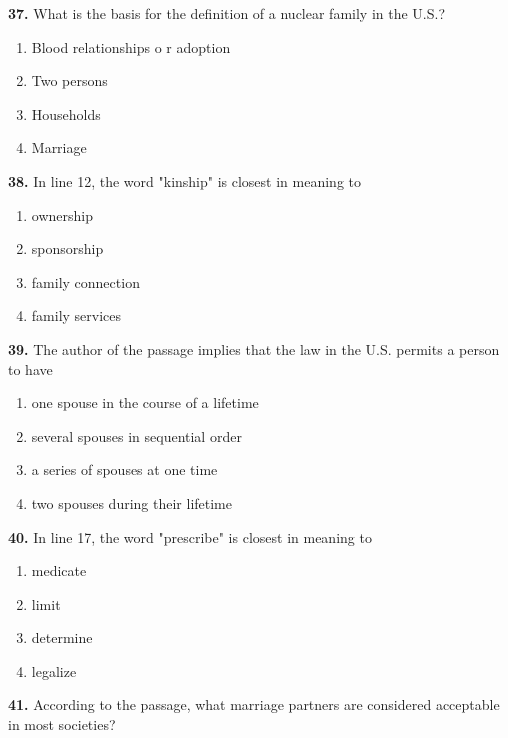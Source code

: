 \documentclass[12pt]{article}
\begin{document}
\par
\vspace{0.25\baselineskip}
\noindent\textbf{37.} What is the basis for the definition of a nuclear family in the U.S.?
\begin{enumerate}[label=(\Alph*),leftmargin=*,itemsep=0.2em]
\item Blood relationships o r adoption
\item Two persons
\item Households
\item Marriage
\end{enumerate}
\par
\vspace{0.25\baselineskip}
\noindent\textbf{38.} In line 12, the word "kinship" is closest in meaning to
\begin{enumerate}[label=(\Alph*),leftmargin=*,itemsep=0.2em]
\item ownership
\item sponsorship
\item family connection
\item family services
\end{enumerate}
\par
\vspace{0.25\baselineskip}
\noindent\textbf{39.} The author of the passage implies that the law in the U.S. permits a person to have
\begin{enumerate}[label=(\Alph*),leftmargin=*,itemsep=0.2em]
\item one spouse in the course of a lifetime
\item several spouses in sequential order
\item a series of spouses at one time
\item two spouses during their lifetime
\end{enumerate}
\par
\vspace{0.25\baselineskip}
\noindent\textbf{40.} In line 17, the word "prescribe" is closest in meaning to
\begin{enumerate}[label=(\Alph*),leftmargin=*,itemsep=0.2em]
\item medicate
\item limit
\item determine
\item legalize
\end{enumerate}
\par
\vspace{0.25\baselineskip}
\noindent\textbf{41.} According to the passage, what marriage partners are considered acceptable in most societies?
\end{document}
